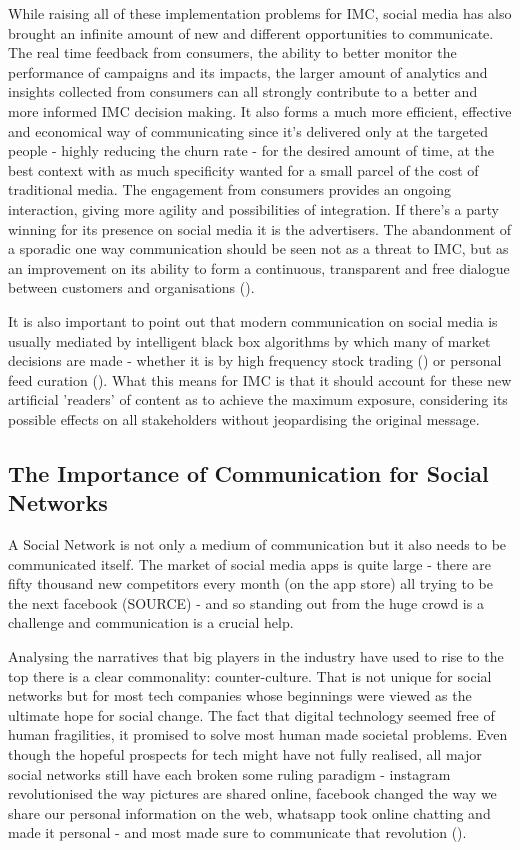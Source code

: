 \documentclass[11pt]{article}
\begin{document}
While raising all of these implementation problems for IMC, social media has also brought an infinite amount of new and different opportunities to communicate. The real time feedback from consumers, the ability to better monitor the performance of campaigns and its impacts, the larger amount of analytics and insights collected from consumers can all strongly contribute to a better and more informed IMC decision making. It also forms a much more efficient, effective and economical way of communicating since it's delivered only at the targeted people - highly reducing the churn rate - for the desired amount of time, at the best context with as much specificity wanted for a small parcel of the cost of traditional media. The engagement from consumers provides an ongoing interaction, giving more agility and possibilities of integration. If there's a party winning for its presence on social media it is the advertisers. The abandonment of a sporadic one way communication should be seen not as a threat to IMC, but as an improvement on its ability to form a continuous, transparent and free dialogue between customers and organisations (\cite{ananda}). 
 
It is also important to point out that modern communication on social media is usually mediated by intelligent black box algorithms by which many of market decisions are made - whether it is by high frequency stock trading (\cite{hft}) or personal feed curation (\cite{algo}). What this means for IMC is that it should account for these new artificial 'readers' of content as to achieve the maximum exposure, considering its possible effects on all stakeholders without jeopardising the original message.  

 \subsection{The Importance of Communication for Social Networks}\label{SN}

A Social Network is not only a medium of communication but it also needs to be communicated itself. The market of social media apps is quite large - there are fifty thousand new competitors every month (on the app store) all trying to be the next facebook (SOURCE) - and so standing out from the huge crowd is a challenge and communication is a crucial help.
 
Analysing the narratives that big players in the industry have used to rise to the top there is a clear commonality: counter-culture. That is not unique for social networks but for most tech companies whose beginnings were viewed as the ultimate hope for social change. The fact that digital technology seemed free of human fragilities, it promised to solve most human made societal problems. Even though the hopeful prospects for tech might have not fully realised, all major social networks still have each broken some ruling paradigm - instagram revolutionised the way pictures are shared online, facebook changed the way we share our personal information on the web, whatsapp took online chatting and made it personal - and most made sure to communicate that revolution (\cite{evil}).
 
\end{document}
